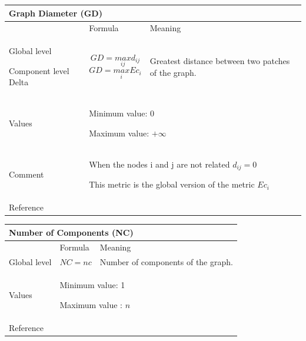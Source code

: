 \documentclass{article}
\begin{document}
\begin{table}[H]
\begin{tabular}{|m{3.24cm}|m{4.4810004cm}m{7.924cm}|}
\hline
\multicolumn{3}{|m{16.044998cm}|}{Graph Diameter (GD)}\\\hline
 &
\multicolumn{1}{m{4.4810004cm}|}{Formula} &
Meaning\\\hline
Global level

Component level Delta &
\multicolumn{1}{m{4.4810004cm}|}{\begin{equation*}
\mathit{GD}=\underset{\mathit{ij}}{\mathit{max}}{d}_{\mathit{ij}}
\end{equation*}
\begin{equation*}
\mathit{GD}=\underset{i}{\mathit{max}}{\mathit{Ec}}_{i}
\end{equation*}
} &
Greatest distance between two patches of the graph. \\\hline
Values &
\multicolumn{2}{m{12.6050005cm}|}{Minimum value: 0

Maximum value:  $+{\infty}$

}\\\hline
Comment &
\multicolumn{2}{m{12.6050005cm}|}{When the nodes i and j are not related
 ${d}_{\mathit{ij}}=0$

This metric is the global version of the metric  ${\mathit{Ec}}_{i}$

}\\\hline
Reference &
\multicolumn{2}{m{12.6050005cm}|}{\cite{Urban2001}
}\\\hline
\end{tabular}
\end{table}


\begin{table}[H]
\begin{tabular}{|m{3.24cm}|m{4.4810004cm}m{7.924cm}|}
\hline
\multicolumn{3}{|m{16.044998cm}|}{Number of Components (NC)}\\\hline
 &
\multicolumn{1}{m{4.4810004cm}|}{Formula} &
Meaning\\\hline
Global  level

 &
\multicolumn{1}{m{4.4810004cm}|}{\begin{equation*}
\mathit{NC}=\mathit{nc}
\end{equation*}
} &
Number of components of the graph.\\\hline
Values &
\multicolumn{2}{m{12.6050005cm}|}{Minimum value: 1

Maximum value :  $n$

}\\\hline
Reference &
\multicolumn{2}{m{12.6050005cm}|}{\cite{Urban2001}
}\\\hline
\end{tabular}
\end{table}
\end{document}
